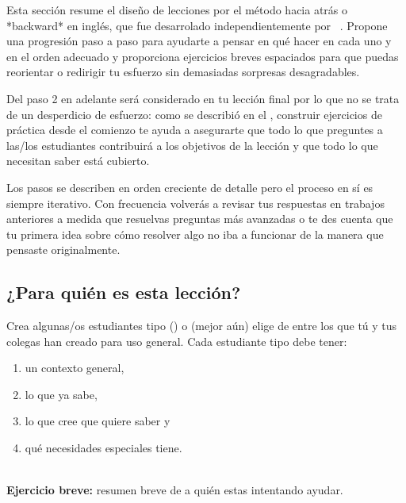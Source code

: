 
Esta sección resume el diseño de lecciones por el método hacia atrás o *backward* en inglés,
que fue desarrolado independientemente por ~\cite{Wigg2005,Bigg2011,Fink2013}.
Propone una progresión paso a paso
para ayudarte a pensar en qué hacer en cada uno y en el orden adecuado
y proporciona ejercicios breves espaciados
para que puedas reorientar o redirigir tu esfuerzo sin demasiadas sorpresas desagradables.

Del paso 2 en adelante será considerado en tu lección final
por lo que no se trata de un desperdicio de esfuerzo:
como se describió en el ,
construir ejercicios de práctica desde el comienzo te ayuda a asegurarte que
todo lo que preguntes a las/los estudiantes contribuirá a los objetivos de la lección
y que todo lo que necesitan saber está cubierto.

Los pasos se describen en orden creciente de detalle
pero el proceso en sí es siempre iterativo.
Con frecuencia volverás a revisar tus respuestas en trabajos anteriores
a medida que resuelvas preguntas más avanzadas
o te des cuenta que tu primera idea sobre cómo resolver algo no iba a funcionar de la manera que pensaste originalmente.

\subsection*{¿Para quién es esta lección?}

Crea algunas/os estudiantes tipo ()
o (mejor aún) elige de entre los que tú y tus colegas han creado para uso general.
Cada estudiante tipo debe tener:

\begin{enumerate}

\item
  un contexto general,

\item
  lo que ya sabe,

\item
  lo que cree que quiere saber y

\item
  qué necesidades especiales tiene.

\end{enumerate}

~\\
\noindent
\textbf{Ejercicio breve:} resumen breve de a quién estas intentando ayudar.

